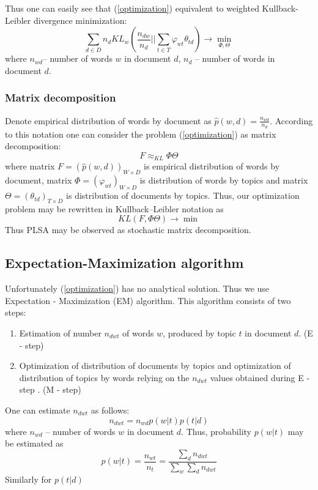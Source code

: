 	Thus one can easily see that (\ref{optimization}) equivalent to weighted Kullback-Leibler divergence minimization:
	\begin{equation}
	    \sum_{d \in D} n_d KL_w \left( \frac{n_{dw}}{n_d} || \sum_{t \in T} \varphi_{wt}\theta_{td} \right) \to \min_{\Phi, \Theta}
	\end{equation}
	    where $n_{wd}$\--- number of words $w$ in document $d$, $n_d$ \--- number of words in document $d$.

    \subsubsection*{Matrix decomposition}
	Denote empirical distribution of words by document as $\hat{p}(w, d) = \frac{n_{wd}}{n_d}$.
	According to this notation one can consider the problem (\ref{optimization}) as matrix decomposition:
	\begin{equation} F \approx_{KL} \Phi \Theta \end{equation}
	where matrix $F = (\hat{p}(w, d))_{W \times D}$ is empirical distribution of words by document,
	matrix $\Phi = (\varphi_{wt})_{W \times D}$ is distribution of words by topics and
	matrix  $\Theta = (\theta_{td})_{T\times D}$ is distribution of documents by topics.
	Thus, our optimization problem may be rewritten in Kullback–Leibler notation as
	\begin{equation} KL(F , \Phi \Theta) \rightarrow \min \end{equation}
	Thus PLSA may be observed as stochastic matrix decomposition.

\subsection*{Expectation\--Maximization algorithm} \label{EMAlgorithm}
	Unfortunately (\ref{optimization}) has no analytical solution. Thus we use Expectation \-- Maximization (EM) algorithm.
	This algorithm consists of two steps:
	\begin{enumerate}
	    \item Estimation of number $n_{dwt}$ of words $w$, produced by topic $t$ in document $d$. (E \-- step)
	    \item Optimization of distribution of documents by topics and optimization of distribution of topics by words relying on
		the $n_{dwt}$ values obtained during E \-- step . (M \-- step)
	\end{enumerate}
	One can estimate $n_{dwt}$ as follows:
	\begin{equation}  n_{dwt} = n_{wd} p(w|t) p(t|d) \end{equation}
	where $n_{wd}$ \--- number of words $w$ in document $d$.
	Thus, probability $p(w|t)$ may be estimated as
	\begin{equation}  p(w|t) = \frac{n_{wt}}{n_t} = \frac{\sum_d n_{dwt} }{\sum_w \sum_d n_{dwt}}   \end{equation}
	Similarly for $p(t|d)$

